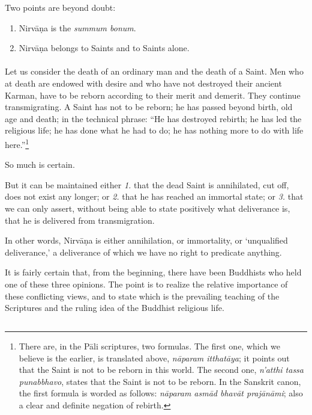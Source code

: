 \documentclass[a4paper, 11pt, oneside, english, landscape]{article}
\begin{document}
Two points are beyond doubt:
\begin{enumerate}
    \item Nirvāṇa is the \emph{summum bonum}.

    \item Nirvāṇa belongs to Saints and to Saints alone.
\end{enumerate}
\paragraph{}
Let us consider the death of an ordinary man and the death of a Saint. Men who at death are endowed with desire and who have not destroyed their ancient Karman, have to be reborn according to their merit and demerit. They continue transmigrating. A Saint has not to be reborn; he has passed beyond birth, old age and death; in the technical phrase: ``He has destroyed rebirth; he has led the religious life; he has done what he had to do; he has nothing more to do with life here.''\footnote{There are, in the Pāli scriptures, two formulas. The first one, which we believe is the earlier, is translated above, \emph{nāparam itthatāya}; it points out that the Saint is not to be reborn in this world. The second one, \emph{n'atthi tassa punabbhavo}, states that the Saint is not to be reborn. In the Sanskrit canon, the first formula is worded as follows: \emph{nāparam asmād bhavāt prajānāmi}; also a clear and definite negation of rebirth.}

So much is certain.

But it can be maintained either \emph{1.} that the dead Saint is annihilated, cut off, does not exist any longer; or \emph{2.} that he has reached an immortal state; or \emph{3.} that we can only assert, without being able to state positively what deliverance is, that he is delivered from transmigration.

In other words, Nirvāṇa is either annihilation, or immortality, or `unqualified deliverance,' a deliverance of which we have no right to predicate anything.

It is fairly certain that, from the beginning, there have been Buddhists who held one of these three opinions. The point is to realize the relative importance of these conflicting views, and to state which is the prevailing teaching of the Scriptures and the ruling idea of the Buddhist religious life.

\subsection{}
\end{document}
